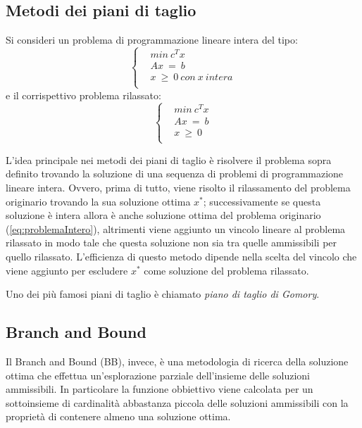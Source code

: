 \subsection{Metodi dei piani di taglio}
Si consideri un problema di programmazione lineare intera del tipo:
\begin{equation}
\label{eq:problemaIntero}
\begin{cases}
& min ~ c^T x \\
& Ax ~ = ~ b \\
& x ~ \geq ~ 0 ~ con ~ x ~ intera \\ 
\end{cases}
\end{equation}
e il corrispettivo problema rilassato:
\begin{equation}
\label{eq:problemaInteroRilass}
\begin{cases}
& min ~ c^T x \\
& Ax ~ = ~ b \\
& x ~ \geq ~ 0 \\
\end{cases}
\end{equation}

L'idea principale nei metodi dei piani di taglio è risolvere il problema sopra definito trovando la soluzione di una sequenza di problemi di programmazione lineare intera.
Ovvero, prima di tutto, viene risolto il rilassamento del problema originario trovando la sua soluzione ottima $x^*$; successivamente se questa soluzione è intera allora è anche soluzione ottima del problema originario (\ref{eq:problemaIntero}), altrimenti viene aggiunto un vincolo lineare al problema rilassato in modo tale che questa soluzione non sia tra quelle ammissibili per quello rilassato.
L'efficienza di questo metodo dipende nella scelta del vincolo che viene aggiunto per escludere $x^*$ come soluzione del problema rilassato.

Uno dei più famosi piani di taglio è chiamato \textit{piano di taglio di Gomory}.
\subsection{Branch and Bound}
Il Branch and Bound (BB), invece, è una metodologia di ricerca della soluzione ottima che effettua un'esplorazione parziale dell'insieme delle soluzioni ammissibili. In particolare la funzione obbiettivo viene calcolata per un sottoinsieme di cardinalità abbastanza piccola delle soluzioni ammissibili con la proprietà di contenere almeno una soluzione ottima.

